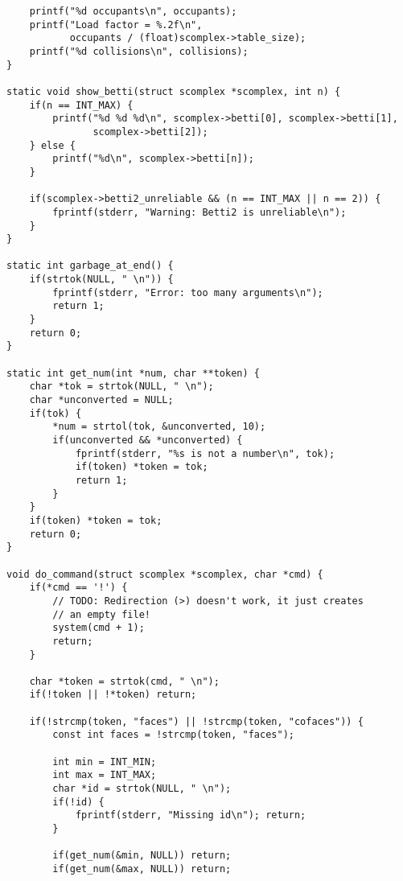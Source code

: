 \documentclass{article}
\begin{document}
\begin{verbatim}
    printf("%d occupants\n", occupants);
    printf("Load factor = %.2f\n",
           occupants / (float)scomplex->table_size);
    printf("%d collisions\n", collisions);
}

static void show_betti(struct scomplex *scomplex, int n) {
    if(n == INT_MAX) {
        printf("%d %d %d\n", scomplex->betti[0], scomplex->betti[1],
               scomplex->betti[2]);
    } else {
        printf("%d\n", scomplex->betti[n]);
    }

    if(scomplex->betti2_unreliable && (n == INT_MAX || n == 2)) {
        fprintf(stderr, "Warning: Betti2 is unreliable\n");
    }
}

static int garbage_at_end() {
    if(strtok(NULL, " \n")) {
        fprintf(stderr, "Error: too many arguments\n");
        return 1;
    }
    return 0;
}

static int get_num(int *num, char **token) {
    char *tok = strtok(NULL, " \n");
    char *unconverted = NULL;
    if(tok) {
        *num = strtol(tok, &unconverted, 10);
        if(unconverted && *unconverted) {
            fprintf(stderr, "%s is not a number\n", tok);
            if(token) *token = tok;
            return 1;
        }
    }
    if(token) *token = tok;
    return 0;
}

void do_command(struct scomplex *scomplex, char *cmd) {
    if(*cmd == '!') {
        // TODO: Redirection (>) doesn't work, it just creates
        // an empty file!
        system(cmd + 1);
        return;
    }

    char *token = strtok(cmd, " \n");
    if(!token || !*token) return;

    if(!strcmp(token, "faces") || !strcmp(token, "cofaces")) {
        const int faces = !strcmp(token, "faces");

        int min = INT_MIN;
        int max = INT_MAX;
        char *id = strtok(NULL, " \n");
        if(!id) {
            fprintf(stderr, "Missing id\n"); return;
        }

        if(get_num(&min, NULL)) return;
        if(get_num(&max, NULL)) return;


\end{verbatim}
\end{document}

